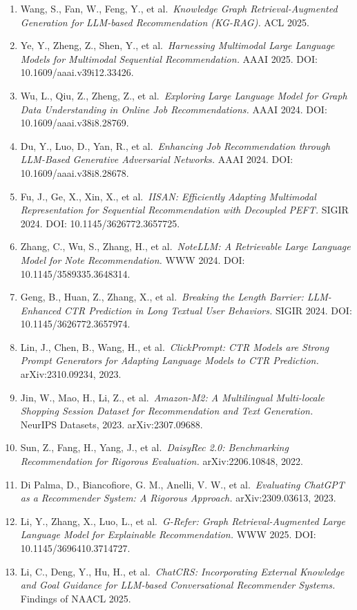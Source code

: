 \begin{enumerate}
\item
  Wang, S., Fan, W., Feng, Y., et al.~\emph{Knowledge Graph Retrieval-Augmented Generation for LLM-based Recommendation (KG-RAG).} ACL 2025.
\item
  Ye, Y., Zheng, Z., Shen, Y., et al.~\emph{Harnessing Multimodal Large Language Models for Multimodal Sequential Recommendation.} AAAI 2025. DOI: 10.1609/aaai.v39i12.33426.
\item
  Wu, L., Qiu, Z., Zheng, Z., et al.~\emph{Exploring Large Language Model for Graph Data Understanding in Online Job Recommendations.} AAAI 2024. DOI: 10.1609/aaai.v38i8.28769.
\item
  Du, Y., Luo, D., Yan, R., et al.~\emph{Enhancing Job Recommendation through LLM-Based Generative Adversarial Networks.} AAAI 2024. DOI: 10.1609/aaai.v38i8.28678.
\item
  Fu, J., Ge, X., Xin, X., et al.~\emph{IISAN: Efficiently Adapting Multimodal Representation for Sequential Recommendation with Decoupled PEFT.} SIGIR 2024. DOI: 10.1145/3626772.3657725.
\item
  Zhang, C., Wu, S., Zhang, H., et al.~\emph{NoteLLM: A Retrievable Large Language Model for Note Recommendation.} WWW 2024. DOI: 10.1145/3589335.3648314.
\item
  Geng, B., Huan, Z., Zhang, X., et al.~\emph{Breaking the Length Barrier: LLM-Enhanced CTR Prediction in Long Textual User Behaviors.} SIGIR 2024. DOI: 10.1145/3626772.3657974.
\item
  Lin, J., Chen, B., Wang, H., et al.~\emph{ClickPrompt: CTR Models are Strong Prompt Generators for Adapting Language Models to CTR Prediction.} arXiv:2310.09234, 2023.
\item
  Jin, W., Mao, H., Li, Z., et al.~\emph{Amazon-M2: A Multilingual Multi-locale Shopping Session Dataset for Recommendation and Text Generation.} NeurIPS Datasets, 2023. arXiv:2307.09688.
\item
  Sun, Z., Fang, H., Yang, J., et al.~\emph{DaisyRec 2.0: Benchmarking Recommendation for Rigorous Evaluation.} arXiv:2206.10848, 2022.
\item
  Di Palma, D., Biancofiore, G. M., Anelli, V. W., et al.~\emph{Evaluating ChatGPT as a Recommender System: A Rigorous Approach.} arXiv:2309.03613, 2023.
\item
  Li, Y., Zhang, X., Luo, L., et al.~\emph{G-Refer: Graph Retrieval-Augmented Large Language Model for Explainable Recommendation.} WWW 2025. DOI: 10.1145/3696410.3714727.
\item
  Li, C., Deng, Y., Hu, H., et al.~\emph{ChatCRS: Incorporating External Knowledge and Goal Guidance for LLM-based Conversational Recommender Systems.} Findings of NAACL 2025.

\end{enumerate}
